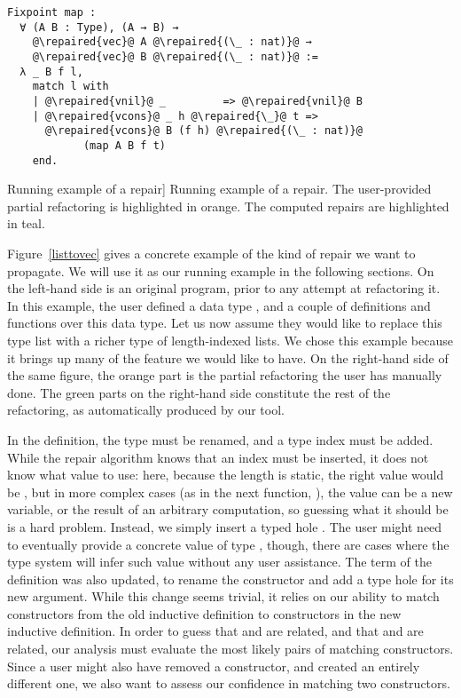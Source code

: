 \begin{figure*}[!htp]
{\begin{minipage}[t]{0.50\textwidth-2\fboxrule-2\fboxsep}
\begin{verbatim}
Fixpoint map :
  ∀ (A B : Type), (A → B) →
    @\repaired{vec}@ A @\repaired{(\_ : nat)}@ →
    @\repaired{vec}@ B @\repaired{(\_ : nat)}@ :=
  λ _ B f l,
    match l with
    | @\repaired{vnil}@ _         => @\repaired{vnil}@ B
    | @\repaired{vcons}@ _ h @\repaired{\_}@ t =>
      @\repaired{vcons}@ B (f h) @\repaired{(\_ : nat)}@
            (map A B f t)
    end.
  \end{verbatim}
\end{minipage}}

\caption%
[Running example of a \Chick{} repair]
{Running example of a \Chick{} repair.  The user-provided partial refactoring is highlighted in orange.  The computed repairs are highlighted in teal.}~\label{listtovec}

\end{figure*}

Figure~\ref{listtovec} gives a concrete example of the kind of repair we want to
propagate.  We will use it as our running example in the following sections.  On
the left-hand side is an original program, prior to any attempt at refactoring
it.  In this example, the user defined a data type , and a
couple of definitions and functions over this data type.  Let us now assume they
would like to replace this type list with a richer type of length-indexed lists.
We chose this example because it brings up many of the feature we would like to
have.  On the right-hand side of the same figure, the orange part is the partial
refactoring the user has manually done.  The green parts on the right-hand side
constitute the rest of the refactoring, as automatically produced by our tool.

In the  definition, the type must be renamed, and a type index
must be added.  While the repair algorithm knows that an index must be inserted,
it does not know what value to use: here, because the length is static, the
right value would be , but in more complex cases (as in the next
function, ), the value can be a new variable, or the result of
an arbitrary computation, so guessing what it should be is a hard problem.
Instead, we simply insert a typed hole .  The user might
need to eventually provide a concrete value of type , though,
there are cases where the type system will infer such value without any user
assistance.  The term of the definition was also updated, to rename the
constructor and add a type hole for its new argument.  While this change seems
trivial, it relies on our ability to match constructors from the old inductive
definition to constructors in the new inductive definition.  In order to guess
that  and  are related, and that 
and  are related, our analysis must evaluate the most likely
pairs of matching constructors.  Since a user might also have removed a
constructor, and created an entirely different one, we also want to assess our
confidence in matching two constructors.

